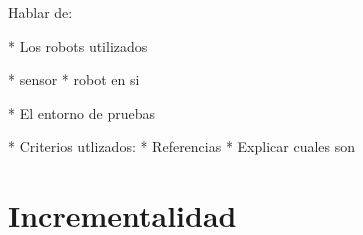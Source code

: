 Hablar de:

* Los robots utilizados

  * sensor 
  * robot en si

* El entorno de pruebas

* Criterios utlizados:
  * Referencias
  * Explicar cuales son

\section{Incrementalidad}

